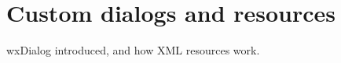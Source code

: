 \chapter{Custom dialogs and resources}\label{chapcustomdialogs}
%
%
\setfooter{\thepage}{}{}{}{}{\thepage}%

wxDialog introduced, and how XML resources work.

